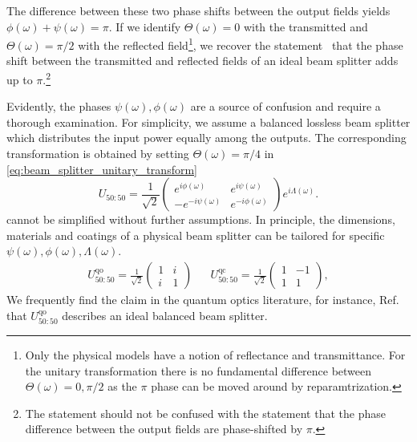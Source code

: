 The difference between these two phase shifts between the output fields yields $\phi(\omega)+\psi(\omega)=\pi$.
If we identify $\Theta(\omega)=0$ with the transmitted and $\Theta(\omega)=\pi/2$ with the reflected field\footnote{Only the physical models have a notion of reflectance and transmittance. For the unitary transformation there is no fundamental difference between $\Theta(\omega)=0,\pi/2$ as the $\pi$ phase can be moved around by reparamtrization.}, we recover the statement~\cite{Zeilinger1981} that the phase shift between the transmitted and reflected fields of an ideal beam splitter adds up to $\pi$.\footnote{The statement should not be confused with the statement that the phase difference between the output fields are phase-shifted by $\pi$.}

Evidently, the phases $\psi(\omega),\phi(\omega)$ are a source of confusion and require a thorough examination.
For simplicity, we assume a balanced lossless beam splitter which distributes the input power equally among the outputs.
The corresponding transformation is obtained by setting $\Theta(\omega)=\pi/4$ in \cref{eq:beam_splitter_unitary_transform}
\begin{equation}
	U_{50:50}
	=
    \frac{1}{\sqrt{2}}
    \begin{pmatrix}
        e^{i\phi(\omega)} & e^{i\psi(\omega)}
        \\
        -e^{-i\psi(\omega)} & e^{-i\phi(\omega)}
    \end{pmatrix}
    e^{i\Lambda(\omega)}
    \label{eq:beam_splitter_unitary_transform_balanced}
    .
\end{equation}
 cannot be simplified without further assumptions.
In principle, the dimensions, materials and coatings of a physical beam splitter can be tailored for specific $\psi(\omega),\phi(\omega),\Lambda(\omega)$.
\begin{align}
	U_{50:50}^\text{qo}
	=
    \frac{1}{\sqrt{2}}
    \begin{pmatrix}
        1 & i\\
        i & 1
    \end{pmatrix}
    &&
	U_{50:50}^\text{qc}
    =
    \frac{1}{\sqrt{2}}
    \begin{pmatrix}
        1 & -1\\
        1 & 1
    \end{pmatrix}
    \label{eq:beam_splitter_unitary_transform_balanced_qoqc},
\end{align}
We frequently find the claim in the quantum optics literature, for instance, Ref.~\cite[p.~138]{Gerry2005} that $U_{50:50}^\text{qo}$ describes an ideal balanced beam splitter.
